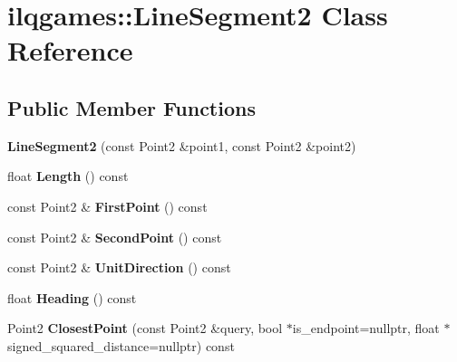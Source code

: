 \hypertarget{classilqgames_1_1_line_segment2}{}\section{ilqgames\+:\+:Line\+Segment2 Class Reference}
\label{classilqgames_1_1_line_segment2}
\subsection*{Public Member Functions}
\begin{DoxyCompactItemize}
\item 
{\bfseries Line\+Segment2} (const Point2 \&point1, const Point2 \&point2)\hypertarget{classilqgames_1_1_line_segment2_a364902f44220f68ea07588641a6778fd}{}\label{classilqgames_1_1_line_segment2_a364902f44220f68ea07588641a6778fd}

\item 
float {\bfseries Length} () const \hypertarget{classilqgames_1_1_line_segment2_a4458797af59ef84bd7ef875a1db3ff14}{}\label{classilqgames_1_1_line_segment2_a4458797af59ef84bd7ef875a1db3ff14}

\item 
const Point2 \& {\bfseries First\+Point} () const \hypertarget{classilqgames_1_1_line_segment2_a1374aed3332613dd7790b4f5dfa4d710}{}\label{classilqgames_1_1_line_segment2_a1374aed3332613dd7790b4f5dfa4d710}

\item 
const Point2 \& {\bfseries Second\+Point} () const \hypertarget{classilqgames_1_1_line_segment2_a513513fbd19254698a2f87fa6f650560}{}\label{classilqgames_1_1_line_segment2_a513513fbd19254698a2f87fa6f650560}

\item 
const Point2 \& {\bfseries Unit\+Direction} () const \hypertarget{classilqgames_1_1_line_segment2_a59a4eb9563be4a49d64deee301f4be6b}{}\label{classilqgames_1_1_line_segment2_a59a4eb9563be4a49d64deee301f4be6b}

\item 
float {\bfseries Heading} () const \hypertarget{classilqgames_1_1_line_segment2_a5a11245e7e612d222795f03e68eb31c1}{}\label{classilqgames_1_1_line_segment2_a5a11245e7e612d222795f03e68eb31c1}

\item 
Point2 {\bfseries Closest\+Point} (const Point2 \&query, bool $\ast$is\+\_\+endpoint=nullptr, float $\ast$signed\+\_\+squared\+\_\+distance=nullptr) const \hypertarget{classilqgames_1_1_line_segment2_a13944bbafcdae15692706c0859b5d3d5}{}\label{classilqgames_1_1_line_segment2_a13944bbafcdae15692706c0859b5d3d5}

\end{DoxyCompactItemize}


